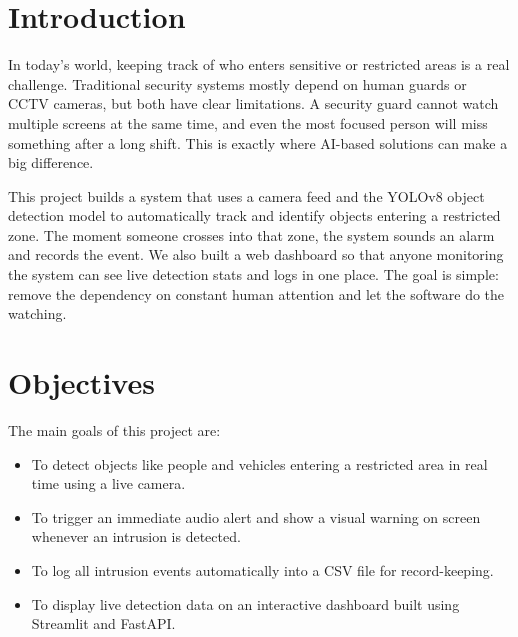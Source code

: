 \documentclass[12pt,a4paper]{article}
\begin{document}
\tableofcontents
\newpage

\section{Introduction}
In today's world, keeping track of who enters sensitive or restricted areas is a real challenge. Traditional security systems mostly depend on human guards or CCTV cameras, but both have clear limitations. A security guard cannot watch multiple screens at the same time, and even the most focused person will miss something after a long shift. This is exactly where AI-based solutions can make a big difference.

This project builds a system that uses a camera feed and the YOLOv8 object detection model to automatically track and identify objects entering a restricted zone. The moment someone crosses into that zone, the system sounds an alarm and records the event. We also built a web dashboard so that anyone monitoring the system can see live detection stats and logs in one place. The goal is simple: remove the dependency on constant human attention and let the software do the watching.

\section{Objectives}
The main goals of this project are:
\begin{itemize}
    \item To detect objects like people and vehicles entering a restricted area in real time using a live camera.
    \item To trigger an immediate audio alert and show a visual warning on screen whenever an intrusion is detected.
    \item To log all intrusion events automatically into a CSV file for record-keeping.
    \item To display live detection data on an interactive dashboard built using Streamlit and FastAPI.
\end{itemize}

\end{document}
